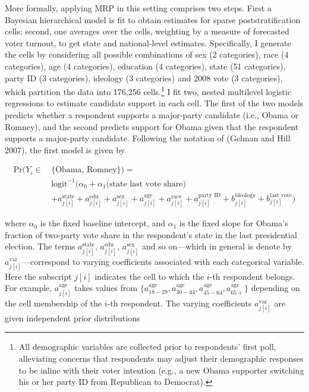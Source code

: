 More formally, applying MRP in this setting comprises two steps. First a
Bayesian hierarchical model is fit to obtain estimates for sparse
poststratification cells; second, one averages over the cells, weighting
by a measure of forecasted voter turnout, to get state and
national-level estimates. Specifically, I generate the cells by
considering all possible combinations of sex (2 categories), race (4
categories), age (4 categories), education (4 categories), state (51
categories), party ID (3 categories), ideology (3 categories) and 2008
vote (3 categories), which partition the data into 176,256
cells.\footnote{All
demographic variables are collected prior to respondents' first poll,
alleviating concerns that respondents may adjust their demographic responses to
be inline with their voter intention (e.g., a new Obama supporter switching his
or her party ID from Republican to Democrat).} I fit two, nested
multilevel logistic regressions to estimate candidate support in each
cell. The first of the two models predicts whether a respondent supports
a major-party candidate (i.e., Obama or Romney), and the second predicts
support for Obama given that the respondent supports a major-party
candidate. Following the notation of (Gelman and Hill 2007), the first
model is given by

\begin{align}\label{eqn:m1}
  \text{Pr}(Y_i \in \, &\{\text{Obama, Romney}\})=\nonumber\\
  &\text{logit}^{-1}\big(\alpha_0+  \alpha_1\text{(state last vote share)} \\
  &+ a^{\text{state}}_{j[i]}+a^{\text{edu}}_{j[i]}+a^{\text{sex}}_{j[i]}+a^{\text{age}}_{j[i]}
  +a^{\text{race}}_{j[i]}+a^{\text{party ID}}_{j[i]}
  +b^{\text{ideology}}_{j[i]} + b^{\text{last vote}}_{j[i]} \big)\nonumber
\end{align}

where \(\alpha_0\) is the fixed baseline intercept, and \(\alpha_1\) is
the fixed slope for Obama's fraction of two-party vote share in the
respondent's state in the last presidential election. The terms
\(a^{\text{state}}_{j[i]}\), \(a^{\text{edu}}_{j[i]}\),
\(a^{\text{sex}}_{j[i]}\) and so on---which in general is denote by
\(a^{\text{var}}_{j[i]}\)---correspond to varying coefficients
associated with each categorical variable. Here the subscript \(j[i]\)
indicates the cell to which the \(i\)-th respondent belongs. For
example, \(a^{\text{age}}_{j[i]}\) takes values from
\(\{a^{\text{age}}_{18-29}, a^{\text{age}}_{30-44}, a^{\text{age}}_{45-64}, a^{\text{age}}_{65+}\}\)
depending on the cell membership of the \(i\)-th respondent. The varying
coefficients \(a_{j[i]}^{\text{var}}\) are given independent prior
distributions

